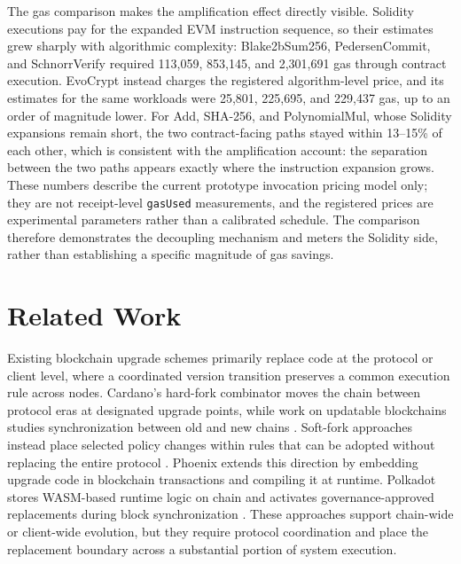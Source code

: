 \documentclass[pdflatex,sn-mathphys-num]{sn-jnl}%
\theoremstyle{thmstyleone}%
\theoremstyle{thmstyletwo}%
\theoremstyle{thmstylethree}%
\begin{document}
The gas comparison makes the amplification effect directly visible. Solidity executions pay for the expanded EVM instruction sequence, so their estimates grew sharply with algorithmic complexity: Blake2bSum256, PedersenCommit, and SchnorrVerify required 113,059, 853,145, and 2,301,691 gas through contract execution. EvoCrypt instead charges the registered algorithm-level price, and its estimates for the same workloads were 25,801, 225,695, and 229,437 gas, up to an order of magnitude lower. For Add, SHA-256, and PolynomialMul, whose Solidity expansions remain short, the two contract-facing paths stayed within 13--15\% of each other, which is consistent with the amplification account: the separation between the two paths appears exactly where the instruction expansion grows. These numbers describe the current prototype invocation pricing model only; they are not receipt-level \texttt{gasUsed} measurements, and the registered prices are experimental parameters rather than a calibrated schedule. The comparison therefore demonstrates the decoupling mechanism and meters the Solidity side, rather than establishing a specific magnitude of gas savings.

\section{Related Work}\label{sec6}

Existing blockchain upgrade schemes primarily replace code at the protocol or client level, where a coordinated version transition preserves a common execution rule across nodes. Cardano's hard-fork combinator moves the chain between protocol eras at designated upgrade points, while work on updatable blockchains studies synchronization between old and new chains \cite{cardanoHardForkCombinator,cardanoEvolution,ciampi2020updatable}. Soft-fork approaches instead place selected policy changes within rules that can be adopted without replacing the entire protocol \cite{zindros2021softPower}. Phoenix extends this direction by embedding upgrade code in blockchain transactions and compiling it at runtime. Polkadot stores WASM-based runtime logic on chain and activates governance-approved replacements during block synchronization \cite{wang2023phoenix,polkadotRuntimeUpgrades}. These approaches support chain-wide or client-wide evolution, but they require protocol coordination and place the replacement boundary across a substantial portion of system execution.
\end{document}
